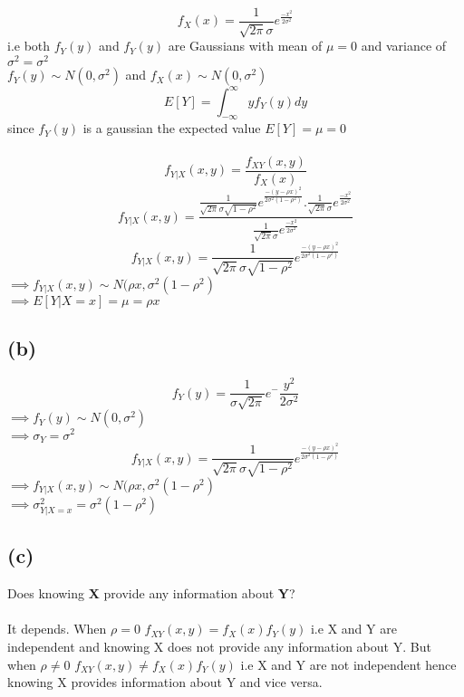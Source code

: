 \documentclass[a4paper,11pt]{article}
\begin{document}
$$f_X(x) =\frac{1}{ \sqrt{2\pi}\sigma}e^{\frac{-x^2}{2\sigma^2}}$$
i.e both $f_Y(y)$  and $f_Y(y)$ are Gaussians with  mean of $\mu = 0$ and variance of $\sigma^2 = \sigma^2$\\
$f_Y(y) \sim N(0,\sigma^2)$ and $f_X(x) \sim N(0,\sigma^2)$\\
$$E[Y] = \int_{-\infty}^{\infty}yf_Y(y)dy$$
since $f_Y(y)$ is a gaussian the expected value $E[Y]=\mu=0$\\\\
$$f_{Y|X}(x,y) = \frac{f_{XY}(x,y)}{f_{X}(x)}$$
$$f_{Y|X}(x,y) = \frac{\frac{1}{ \sqrt{2\pi}\sigma\sqrt{1-\rho^2}}e^{\frac{-(y-\rho x)^2}{2\sigma^2(1-\rho^2)}}.
\frac{1}{ \sqrt{2\pi}\sigma}e^{\frac{-x^2}{2\sigma^2}}}{\frac{1}{ \sqrt{2\pi}\sigma}e^{\frac{-x^2}{2\sigma^2}}}$$
$$f_{Y|X}(x,y) = \frac{1}{ \sqrt{2\pi}\sigma\sqrt{1-\rho^2}}e^{\frac{-(y-\rho x)^2}{2\sigma^2(1-\rho^2)}}$$
$\implies f_{Y|X}(x,y) \sim  N(\rho x,\sigma^2(1-\rho^2)$\\
$\implies E[Y|X=x]=\mu=\rho x$
\subsection*{(b)} 
$$f_Y(y) = \frac{1}{\sigma\sqrt{2\pi}}e^-{\frac{y^2}{2\sigma^2}}$$ 
$\implies f_{Y}(y) \sim N(0,\sigma^2)$\\
$\implies \sigma_Y=\sigma^2$\\
$$f_{Y|X}(x,y) = \frac{1}{ \sqrt{2\pi}\sigma\sqrt{1-\rho^2}}e^{\frac{-(y-\rho x)^2}{2\sigma^2(1-\rho^2)}}$$
$\implies f_{Y|X}(x,y) \sim N(\rho x,\sigma^2(1-\rho^2)$\\
$\implies \sigma_{Y|X=x}^2=\sigma^2(1-\rho^2)$\\
\subsection*{(c)}
Does knowing \textbf{X} provide any information about \textbf{Y}?\\\\
It depends. When $\rho=0$ $f_{XY}(x,y) = f_X(x)f_Y(y)$ i.e X and Y are independent and knowing X does not provide any information about Y. But when $\rho\neq 0$ $f_{XY}(x,y) \neq f_X(x)f_Y(y)$ i.e X and Y are not independent hence knowing X provides information about Y and vice versa.
\end{document}
